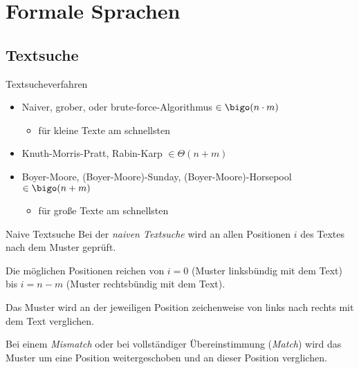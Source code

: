 \section{Formale Sprachen}
\subsection{Textsuche}

\begin{bonus}{Textsucheverfahren}
    \begin{itemize}
        \item Naiver, grober, oder brute-force-Algorithmus $\in \bigo(n \cdot m)$
              \begin{itemize}
                  \item für kleine Texte am schnellsten
              \end{itemize}
        \item Knuth-Morris-Pratt, Rabin-Karp $\in \Theta(n + m)$
        \item Boyer-Moore, (Boyer-Moore)-Sunday, (Boyer-Moore)-Horsepool $\in \bigo(n + m)$
              \begin{itemize}
                  \item für große Texte am schnellsten
              \end{itemize}
    \end{itemize}
\end{bonus}

\begin{algo}{Naive Textsuche}
    Bei der \emph{naiven Textsuche} wird an allen Positionen $i$ des Textes nach dem Muster geprüft.

    Die möglichen Positionen reichen von $i=0$ (Muster linksbündig mit dem Text) bis $i = n-m$ (Muster rechtsbündig mit dem Text).

    Das Muster wird an der jeweiligen Position zeichenweise von links nach rechts mit dem Text verglichen.

    Bei einem \emph{Mismatch} oder bei vollständiger Übereinstimmung (\emph{Match}) wird das Muster um eine Position weitergeschoben und an dieser Position verglichen.
\end{algo}

